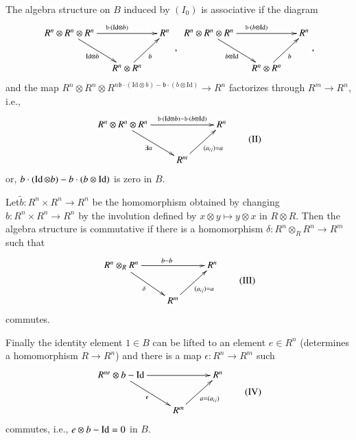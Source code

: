 The algebra structure on $B$ induced by $(I_{0})$ is associative if
the diagram
\[
\vcenter{\xymatrix@C=.45cm{
R^{n}\otimes R^{n}\otimes R^{n}\ar[dr]_{\text{Id}\otimes
  b}\ar[rr]^{\mathfrak{b}\cdot (\text{Id}\otimes b)} & & R^{n}\\
& R^{n}\otimes R^{n}\ar[ur]_{b}
}
}~,~
\vcenter{\xymatrix@C=.45cm{
R^{n}\otimes R^{n}\otimes R^{n}\ar[dr]_{b\otimes
  \text{Id}}\ar[rr]^{\mathfrak{b}\cdot (b\otimes \text{Id})} & & R^{n}\\
& R^{n}\otimes R^{n}\ar[ur]_{b}
}},
\]
and the map $R^{n}\otimes R^{n}\otimes R^{n\mathfrak{b}\cdot
  (\text{Id}\otimes b)-\mathfrak{b}\cdot (b\otimes \text{Id})}\to
R^{n}$ factorizes through $R^{m}\to R^{n}$, i.e.,
\begin{equation*}
\vcenter{\xymatrix{
R^{n}\otimes R^{n}\otimes
R^{n}\ar[dr]_{\exists\alpha}\ar[rr]^-{\mathfrak{b}\cdot(\text{Id}\otimes
  b)-\mathfrak{b}\cdot (b\otimes\text{Id})} & & R^{n}\\
 & R^{m}\ar[ur]_{(a_{ij})=a}
}}\tag{II}
\end{equation*}
or, $b\cdot (\operatorname{Id}\otimes b)-b\cdot(b\otimes \operatorname{Id})$ is zero in $B$.

Let\pageoriginale $\widetilde{b}:R^{n}\times R^{n}\to R^{n}$ be the
homomorphism obtained by changing $b:R^{n}\times R^{n}\to R^{n}$ by
the involution defined by $x\otimes y\mapsto y\otimes x$ in $R\otimes
R$. Then the algebra structure is commutative if there is a
homomorphism $\delta:R^{n}\otimes_{R}R^{n}\to R^{m}$ such that
\begin{equation*}
\vcenter{
\xymatrix{
R^{n}\otimes_{R}R^{n}\ar[dr]_{\delta}\ar[rr]^{b-b} & & R^{n}\\
 & R^{m}\ar[ur]_{(a_{ij})=a} &
}}\tag{III}
\end{equation*}
commutes.

Finally the identity element $1\in B$ can be lifted to an element
$e\in R^{n}$ (determines a homomorphism $R\to R^{n}$) and there is a
map $\epsilon:R^{n}\to R^{m}$ such 
\begin{equation*}
\vcenter{
\xymatrix{
R^{ne}\otimes b-\Id \ar[dr]_{\epsilon}\ar[rr] & & R^{n}\\
 & R^{m}\ar[ur]_{a=(a_{ij})} &
}}\tag{IV}
\end{equation*}
commutes, i.e., $e\otimes b-\operatorname{Id}=0$ in $B$.

